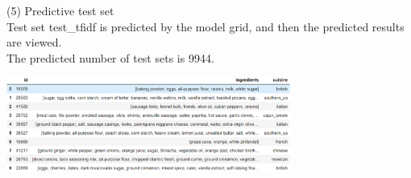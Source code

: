 (5)  Predictive test set\\
    Test set test_tfidf is predicted by the model grid, and then the predicted results are viewed.\\
    The predicted number of test sets is 9944.
    \begin{center}
      \begin{minipage}{1\linewidth}
       \centering
       \includegraphics[width=0.7\textwidth]{pic01/result.eps}
      \end{minipage}

      \hfill
    \end{center}

  


